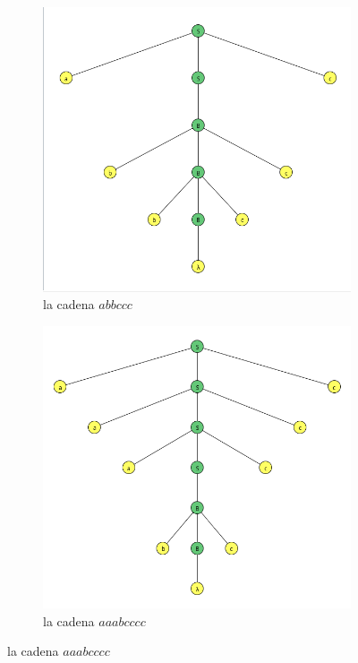 \documentclass{article}
\begin{document}
\begin{flushleft}
\begin{enumerate}
\begin{figure}[h]
\begin{subfigure}[b]{0.45\textwidth}
                        \includegraphics[width=\textwidth]{./Imagenes/grafo12.png}
                        \caption{la cadena $abbccc$}
                        \label{fig:label24}
                    \end{subfigure}
                    \hfill
                    \begin{subfigure}[b]{0.45\textwidth}
                        \centering
                        \includegraphics[width=\textwidth]{./Imagenes/grafo13.png}
                        \caption{la cadena $aaabcccc$}
                        \label{fig:label25}
                    \end{subfigure}
                    \label{fig:matrix6}
                \end{figure}


            \end{enumerate}
        \end{flushleft}



    
\end{document}
